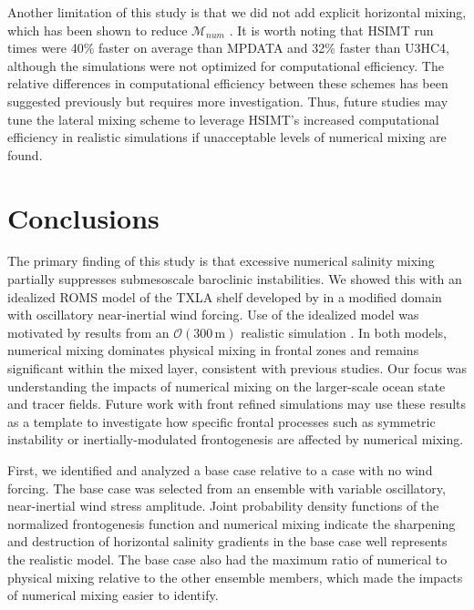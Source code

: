 Another limitation of this study is that we did not add explicit horizontal mixing, which has been shown to reduce $\mathcal{M}_{num}$ \citep{Griffies_2000,Holmes_2021,Ilicak_2012}. It is worth noting that HSIMT run times were 40\% faster on average than MPDATA and 32\% faster than U3HC4, although the simulations were not optimized for computational efficiency. The relative differences in computational efficiency between these schemes has been suggested previously \citep{wu2010advection, wu2023evaluation} but requires more investigation. Thus, future studies may tune the lateral mixing scheme to leverage HSIMT's increased computational efficiency in realistic simulations if unacceptable levels of numerical mixing are found. 

\section{Conclusions} \label{sec:conclusions}

The primary finding of this study is that excessive numerical salinity mixing partially suppresses submesoscale baroclinic instabilities. We showed this with an idealized ROMS model of the TXLA shelf developed by \citet{Hetland_2017} in a modified domain with oscillatory near-inertial wind forcing. Use of the idealized model was motivated by results from an $\mathcal{O}(300 \, \text{m})$ realistic simulation \citet{Schlichting23}. In both models, numerical mixing dominates physical mixing in frontal zones and remains significant within the mixed layer, consistent with previous studies. Our focus was understanding the impacts of numerical mixing on the larger-scale ocean state and tracer fields. Future work with front refined simulations may use these results as a template to investigate how specific frontal processes such as symmetric instability or inertially-modulated frontogenesis are affected by numerical mixing.  

First, we identified and analyzed a base case relative to a case with no wind forcing. The base case was selected from an ensemble with variable oscillatory, near-inertial wind stress amplitude. Joint probability density functions of the normalized frontogenesis function and numerical mixing indicate the sharpening and destruction of horizontal salinity gradients in the base case well represents the realistic model. The base case also had the maximum ratio of numerical to physical mixing relative to the other ensemble members, which made the impacts of numerical mixing easier to identify. 

